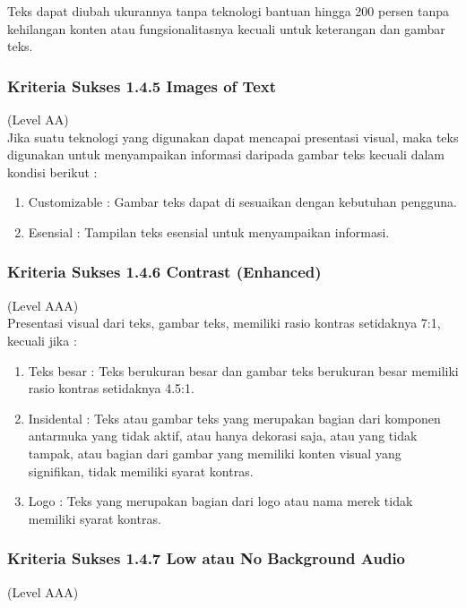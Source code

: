\documentclass[a4paper,twoside]{article}
\begin{document}
\begin{enumerate}
		Teks dapat diubah ukurannya tanpa teknologi bantuan hingga 200 persen tanpa kehilangan konten atau fungsionalitasnya kecuali untuk keterangan dan gambar teks.
		
		\subsubsection*{Kriteria Sukses 1.4.5 Images of Text}
		\label{subsubsec:kriteria_1.4.5}
		(Level AA) \\
		
		Jika suatu teknologi yang digunakan dapat mencapai presentasi visual, maka teks digunakan untuk menyampaikan informasi daripada gambar teks kecuali dalam kondisi berikut :
		
		\begin{enumerate}
			\item Customizable : Gambar teks dapat di sesuaikan dengan kebutuhan pengguna.
			\item Esensial : Tampilan teks esensial untuk menyampaikan informasi.
		\end{enumerate}
		
		\subsubsection*{Kriteria Sukses 1.4.6 Contrast (Enhanced)}
		\label{subsubsec:kriteria_1.4.6}
		(Level AAA) \\
		
		Presentasi visual dari teks, gambar teks, memiliki rasio kontras setidaknya 7:1, kecuali jika :
		
		\begin{enumerate}
			\item Teks besar : Teks berukuran besar dan gambar teks berukuran besar memiliki rasio kontras setidaknya 4.5:1.
			\item Insidental : Teks atau gambar teks yang merupakan bagian dari komponen antarmuka yang tidak aktif, atau hanya dekorasi saja, atau yang tidak tampak, atau bagian dari gambar yang memiliki konten visual yang signifikan, tidak memiliki syarat kontras.
			\item Logo : Teks yang merupakan bagian dari logo atau nama merek tidak memiliki syarat kontras.
		\end{enumerate}
		
		\subsubsection*{Kriteria Sukses 1.4.7 Low atau No Background Audio}
		\label{subsubsec:kriteria_1.4.7}
		(Level AAA) \\
		

\end{enumerate}
\end{document}

